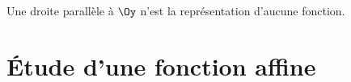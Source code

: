 \begin{att}
Une droite parallèle à $\Oy$ n'est la représentation d'aucune fonction.
\end{att}
%
%
\pagebreak
\section{\'Etude d'une fonction affine}
%
%
%
%
%
